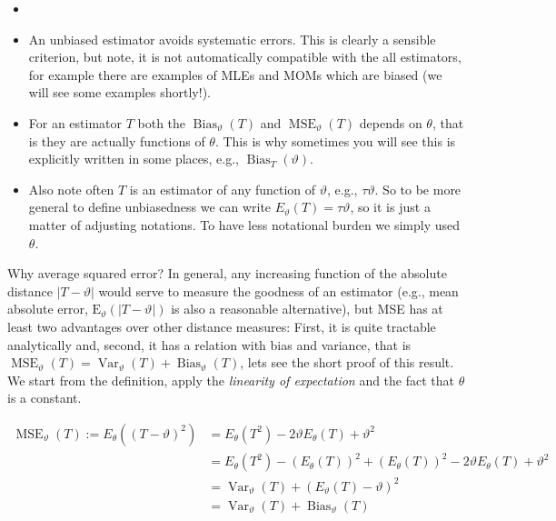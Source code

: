 \documentclass[ 11pt,%
				a4paper,%
				twoside,%
				headinclude,%
				footinclude = true,%
				cleardoublepage = empty,%
				reqno]{scrbook}
\begin{document}
\begin{remarks}

\begin{itemize}
  \item[]
  \item An unbiased estimator avoids systematic errors. This is clearly a sensible criterion, but note, it is not automatically compatible with the all estimators, for example there are examples of MLEs and MOMs which are biased (we will see some examples shortly!). 

  \item For an estimator $T$ both the $\operatorname{Bias}_{\vartheta}(T)$ and $\operatorname{MSE}_{\vartheta}(T)$ depends on $\theta$, that is they are actually functions of $\theta$. This is why sometimes you will see this is explicitly written in some places, e.g.,  $\operatorname{Bias}_{T}(\vartheta)$. 

  \item Also note often $T$ is an estimator of any function of $\vartheta$, e.g., $\tau{\vartheta}$. So to be more general to define unbiasedness we can write $E_{\vartheta}(T)=\tau{\vartheta} $, so it is just a matter of adjusting notations. To have less notational burden we simply used $\theta$. 
\end{itemize}
  
\end{remarks}
 

Why average squared error? In general, any increasing function of the absolute distance $|T-\vartheta|$ would serve to measure the goodness of an estimator (e.g., mean absolute error, $\mathrm{E}_{\vartheta}(|T-\vartheta|)$ is also a reasonable alternative), but MSE has at least two advantages over other distance measures: First, it is quite tractable analytically and, second, it has a relation with bias and variance, that is $\operatorname{MSE}_{\vartheta}(T) = \operatorname{Var}_{\vartheta}(T)+\operatorname{Bias}_{\vartheta}(T)$, lets see the short proof of this result. We start from the definition, apply the \emph{linearity of expectation} and the fact that $\theta$ is a constant.

\begin{align*}
\operatorname{MSE}_{\vartheta}(T) := E_{\theta}\left((T-\vartheta)^{2}\right) &=E_{\theta}\left(T^{2}\right)-2 \vartheta E_{\theta}(T)+\vartheta^{2} \\
&=E_{\theta}\left(T^{2}\right)-\left(E_{\theta}(T)\right)^{2}+\left(E_{\theta}(T)\right)^{2}-2 \vartheta E_{\theta}(T)+\vartheta^{2} \\
&=\operatorname{Var}_{\vartheta}(T)+\left(E_{\vartheta}(T)-\vartheta\right)^{2} \\
&=\operatorname{Var}_{\vartheta}(T)+\operatorname{Bias}_{\vartheta}(T)
\end{align*}
\end{document}
